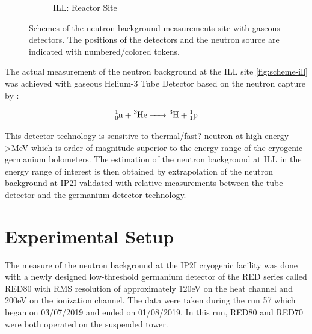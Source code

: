 \begin{figure}
\begin{subfigure}{0.5\textwidth}
  \caption{ILL: Reactor Site}
  \label{fig:scheme-ip2i}
\end{subfigure}
\caption{Schemes of the neutron background measurements site with  gaseous detectors. The positions of the detectors and the neutron source are indicated with numbered/colored tokens.}
\label{fig:scheme-site}
\end{figure}

The actual measurement of the neutron background at the ILL site \ref{fig:scheme-ill} was achieved with gaseous Helium-3 Tube Detector based on the neutron capture by :

\begin{equation}
	\ce{^1_0n + ^3He -> ^3H + ^1_1p}
\end{equation}

This detector technology is sensitive to thermal/fast? neutron at high energy >MeV which is order of magnitude superior to the energy range of the cryogenic germanium bolometers.
The estimation of the neutron background at ILL in the energy range of interest is then obtained by extrapolation of the neutron background at IP2I validated with relative measurements between the tube detector and the germanium detector technology.


\section{Experimental Setup}

The measure of the neutron background at the IP2I cryogenic facility was done with a newly designed low-threshold germanium detector of the RED series called RED80 with RMS resolution of approximately 120eV on the heat channel and 200eV on the ionization channel.
The data were taken during the run 57 which began on 03/07/2019 and ended on 01/08/2019. In this run, RED80 and RED70 were both operated on the suspended tower.

